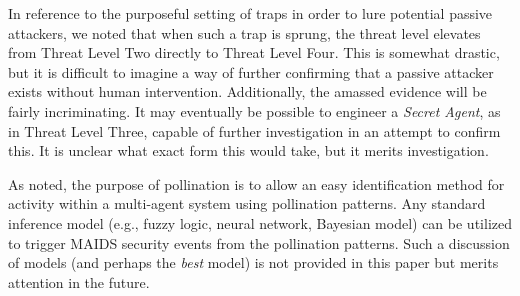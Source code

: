 \documentclass{acm_proc_article-sp}
\begin{document}
In reference to the purposeful setting of traps in order to lure potential passive attackers, we noted that when such a trap is sprung, the threat level elevates from Threat Level Two directly to Threat Level Four.  This is somewhat drastic, but it is difficult to imagine a way of further confirming that a passive attacker exists without human intervention.  Additionally, the amassed evidence will be fairly incriminating.  It may eventually be possible to engineer a {\it Secret Agent}, as in Threat Level Three, capable of further investigation in an attempt to confirm this.  It is unclear what exact form this would take, but it merits investigation.

As noted, the purpose of pollination is to allow an easy identification method for activity within a multi-agent system using pollination patterns.  Any standard inference model (e.g., fuzzy logic, neural network, Bayesian model) can be utilized to trigger MAIDS security events from the pollination patterns.  Such a discussion of models (and perhaps the {\it best} model) is not provided in this paper but merits attention in the future.

\nocite{*}


\balancecolumns
\end{document}
